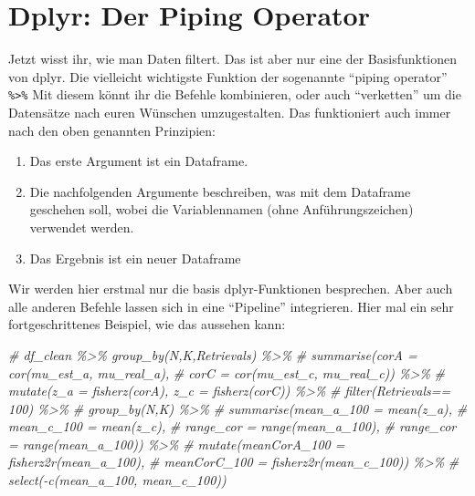 \documentclass[
]{book}
\newenvironment{Shaded}{\begin{snugshade}}{\end{snugshade}}
\newcommand{\CommentTok}[1]{\textcolor[rgb]{0.56,0.35,0.01}{\textit{#1}}}
\theoremstyle{definition}
\theoremstyle{definition}
\theoremstyle{definition}
\theoremstyle{definition}
\theoremstyle{remark}
\begin{document}
\hypertarget{dplyr-der-piping-operator}{%
\section{Dplyr: Der Piping Operator}\label{dplyr-der-piping-operator}}

Jetzt wisst ihr, wie man Daten filtert. Das ist aber nur eine der Basisfunktionen von dplyr. Die vielleicht wichtigste Funktion der sogenannte ``piping operator'' \texttt{\%\textgreater{}\%} Mit diesem könnt ihr die Befehle kombinieren, oder auch ``verketten'' um die Datensätze nach euren Wünschen umzugestalten. Das funktioniert auch immer nach den oben genannten Prinzipien:

\begin{enumerate}
\def\labelenumi{\arabic{enumi}.}
\item
  Das erste Argument ist ein Dataframe.
\item
  Die nachfolgenden Argumente beschreiben, was mit dem Dataframe geschehen soll, wobei die Variablennamen (ohne Anführungszeichen) verwendet werden.
\item
  Das Ergebnis ist ein neuer Dataframe
\end{enumerate}

Wir werden hier erstmal nur die basis dplyr-Funktionen besprechen. Aber auch alle anderen Befehle lassen sich in eine ``Pipeline'' integrieren. Hier mal ein sehr fortgeschrittenes Beispiel, wie das aussehen kann:

\begin{Shaded}
\begin{Highlighting}[]
\CommentTok{\# df\_clean \%\textgreater{}\% group\_by(N,K,Retrievals) \%\textgreater{}\%  }
\CommentTok{\#   summarise(corA = cor(mu\_est\_a, mu\_real\_a),}
\CommentTok{\#             corC = cor(mu\_est\_c, mu\_real\_c)) \%\textgreater{}\%}
\CommentTok{\#   mutate(z\_a = fisherz(corA), z\_c = fisherz(corC)) \%\textgreater{}\% }
\CommentTok{\#   filter(Retrievals== 100) \%\textgreater{}\%}
\CommentTok{\#   group\_by(N,K) \%\textgreater{}\%  }
\CommentTok{\#   summarise(mean\_a\_100 = mean(z\_a),}
\CommentTok{\#             mean\_c\_100 = mean(z\_c),}
\CommentTok{\#             range\_cor = range(mean\_a\_100),}
\CommentTok{\#             range\_cor = range(mean\_a\_100)) \%\textgreater{}\%}
\CommentTok{\#   mutate(meanCorA\_100 = fisherz2r(mean\_a\_100),}
\CommentTok{\#          meanCorC\_100 = fisherz2r(mean\_c\_100)) \%\textgreater{}\%}
\CommentTok{\#   select({-}c(mean\_a\_100, mean\_c\_100))}
\end{Highlighting}
\end{Shaded}
\end{document}

